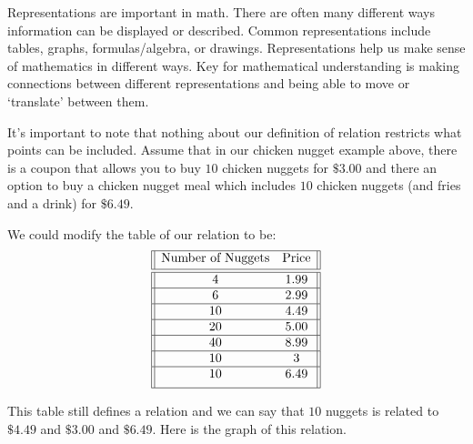 \documentclass{ximera}
\begin{document}
\begin{MM}
Representations are important in math. There are often many different
ways information can be displayed or described. Common representations
include tables, graphs, formulas/algebra, or drawings. Representations
help us make sense of mathematics in different ways. Key for
mathematical understanding is making connections between different
representations and being able to move or `translate' between them.
\end{MM}



\begin{example}
It's important to note that nothing about our definition of relation restricts what points can be included.  Assume that in our chicken nugget example above, there is a coupon that allows you to buy $10$ chicken nuggets for $\$3.00$ and there an option to buy a chicken nugget meal which includes $10$ chicken nuggets (and fries and a drink) for $\$6.49$.  

\begin{explanation}
We could modify the table of our relation to be:
$$
 \begin{array}{||c c||} 
 \hline
 \text{Number of Nuggets} & \text{Price} \\[0.5ex] 
 \hline\hline
 4 & 1.99\\ 
 \hline
 6 & 2.99 \\
 \hline
 10 & 4.49\\
 \hline
 20 & 5.00 \\
 \hline
 40 & 8.99\\ 
 \hline
 10 & 3 \\
 \hline
 10 & 6.49\\[1ex] 
 \hline
\end{array}
$$


This table still defines a relation and we can say that $10$ nuggets is
related to $\$4.49$ and $\$3.00$ and $\$6.49$. Here is the graph of
this relation.


\end{explanation}
\end{example}
\end{document}
